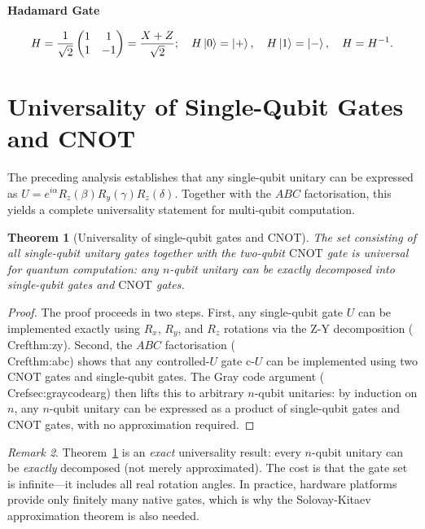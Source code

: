 \documentclass[12pt, a4paper, oneside]{report}
\theoremstyle{plain}
\newtheorem{theorem}{Theorem}[chapter]
\theoremstyle{definition}
\theoremstyle{remark}
\newtheorem{remark}[theorem]{Remark}
\newcommand{\cU}{\mathrm{c}\text{-}U}
\newcommand{\CNOT}{\mathrm{CNOT}}
\newcommand{\Rx}{R_x}
\newcommand{\Ry}{R_y}
\newcommand{\Rz}{R_z}
\begin{document}
\textbf{Hadamard Gate}

\[
  H = \frac{1}{\sqrt{2}}\begin{pmatrix}1&1\\1&-1\end{pmatrix} = \frac{X+Z}{\sqrt{2}};\quad
  H\ket{0}=\ket{+},\quad H\ket{1}=\ket{-},\quad H=H^{-1}.
\]



\section{Universality of Single-Qubit Gates and CNOT}

The preceding analysis establishes that any single-qubit unitary can be expressed as
$U = e^{i\alpha}\Rz(\beta)\Ry(\gamma)\Rz(\delta)$. Together with the $ABC$ factorisation,
this yields a complete universality statement for multi-qubit computation.

\begin{theorem}[Universality of single-qubit gates and CNOT]
\label{thm:sq-cnot-univ}
The set consisting of all single-qubit unitary gates together with the two-qubit $\CNOT$
gate is universal for quantum computation: any $n$-qubit unitary can be exactly decomposed
into single-qubit gates and $\CNOT$ gates.
\end{theorem}

\begin{proof}
The proof proceeds in two steps. First, any single-qubit gate $U$ can be implemented exactly
using $\Rx$, $\Ry$, and $\Rz$ rotations via the Z-Y decomposition (\\Cref{thm:zy}). Second,
the $ABC$ factorisation (\\Cref{thm:abc}) shows that any controlled-$U$ gate $\cU$ can be
implemented using two $\CNOT$ gates and single-qubit gates. The Gray code argument
(\\Cref{sec:graycodearg}) then lifts this to arbitrary $n$-qubit unitaries: by induction on
$n$, any $n$-qubit unitary can be expressed as a product of single-qubit gates and $\CNOT$
gates, with no approximation required.
\end{proof}

\begin{remark}
Theorem~\ref{thm:sq-cnot-univ} is an \emph{exact} universality result: every $n$-qubit
unitary can be \emph{exactly} decomposed (not merely approximated). The cost is that the
gate set is infinite---it includes all real rotation angles. In practice, hardware platforms
provide only finitely many native gates, which is why the Solovay-Kitaev approximation
theorem is also needed.
\end{remark}
\end{document}
